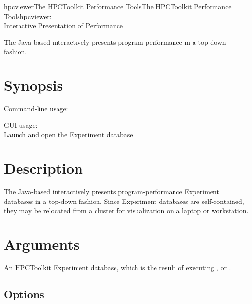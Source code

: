 \documentclass[english]{article}
\begin{document}
\begin{Name}{1}{hpcviewer}{The HPCToolkit Performance Tools}{The HPCToolkit Performance Tools}{hpcviewer:\\ Interactive Presentation of Performance}

The Java-based  interactively presents program performance in a top-down fashion.

\end{Name}

\section{Synopsis}

Command-line usage:\\
\SP\SP\SP{}  

GUI usage:\\
\SP\SP\SP Launch  and open the Experiment database .


\section{Description}

The Java-based  interactively presents program-performance Experiment databases in a top-down fashion.
Since Experiment databases are self-contained, they may be relocated from a cluster for visualization on a laptop or workstation.

\section{Arguments}

\begin{Description}
\item[\Arg{hpctoolkit-database}] An HPCToolkit Experiment database, which is the result of executing ,  or .
\end{Description}


\subsection{Options}
\end{document}
